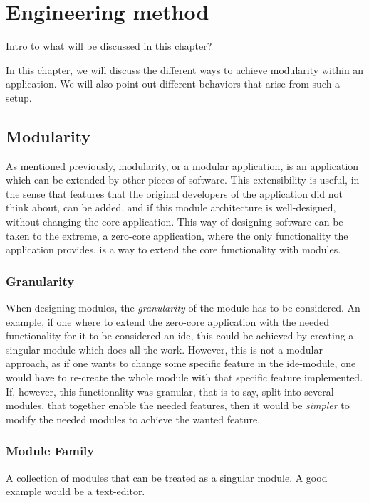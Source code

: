 \chapter{Engineering method}

Intro to what will be discussed in this chapter?

In this chapter, we will discuss the different ways to achieve modularity within
an application. We will also point out different behaviors that arise from such
a setup.

\section{Modularity}

As mentioned previously, modularity, or a modular application, is an application
which can be extended by other pieces of software. This extensibility is useful,
in the sense that features that the original developers of the application did
not think about, can be added, and if this module architecture is well-designed,
without changing the core application. This way of designing software can be
taken to the extreme, a zero-core application, where the only functionality the
application provides, is a way to extend the core functionality with modules.

\subsection{Granularity}

When designing modules, the \textit{granularity} of the module has to be
considered. An example, if one where to extend the zero-core application with
the needed functionality for it to be considered an \gls{ide}, this could be
achieved by creating a singular module which does all the work. However, this
is not a modular approach, as if one wants to change some specific feature in
the \gls{ide}-module, one would have to re-create the whole module with that
specific feature implemented. If, however, this functionality was granular,
that is to say, split into several modules, that together enable the needed
features, then it would be \textit{simpler} to modify the needed modules to
achieve the wanted feature.

\subsection{Module Family}

A collection of modules that can be treated as a singular module. A good example
would be a text-editor.

